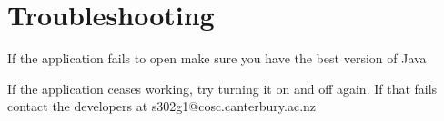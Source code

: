 \section{Troubleshooting}

If the application fails to open make sure you have the best version of Java

If the application ceases working, try turning it on and off again. If that fails contact the developers at s302g1@cosc.canterbury.ac.nz